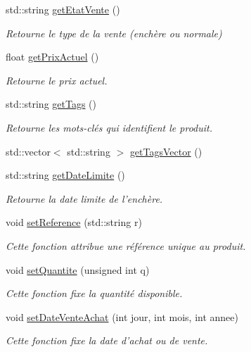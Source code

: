 \begin{DoxyCompactItemize}
std\-::string \hyperlink{class_produit_aa0421a8a8a05684059fa5c26fc6b09e5}{get\-Etat\-Vente} ()
\begin{DoxyCompactList}\small\item\em Retourne le type de la vente (enchère ou normale) \end{DoxyCompactList}\item 
float \hyperlink{class_produit_a8df31b7e2ca9fc0cf330cbed2efd22d0}{get\-Prix\-Actuel} ()
\begin{DoxyCompactList}\small\item\em Retourne le prix actuel. \end{DoxyCompactList}\item 
std\-::string \hyperlink{class_produit_a7b44df89f061edee42a971f2c172965b}{get\-Tags} ()
\begin{DoxyCompactList}\small\item\em Retourne les mots-\/clés qui identifient le produit. \end{DoxyCompactList}\item 
std\-::vector$<$ std\-::string $>$ \hyperlink{class_produit_ab8b15ff1ad286eb2e8a8f9afae3194f1}{get\-Tags\-Vector} ()
\item 
std\-::string \hyperlink{class_produit_a7bd69ad69057b77be95569b597dc058d}{get\-Date\-Limite} ()
\begin{DoxyCompactList}\small\item\em Retourne la date limite de l'enchère. \end{DoxyCompactList}\item 
void \hyperlink{class_produit_a34da537b2544450854d932c2cb695d6d}{set\-Reference} (std\-::string r)
\begin{DoxyCompactList}\small\item\em Cette fonction attribue une référence unique au produit. \end{DoxyCompactList}\item 
void \hyperlink{class_produit_aee71ce4e667afde2773fea21c663d816}{set\-Quantite} (unsigned int q)
\begin{DoxyCompactList}\small\item\em Cette fonction fixe la quantité disponible. \end{DoxyCompactList}\item 
void \hyperlink{class_produit_a609f2dfcf93cc5a41ef69f3e4ed4598f}{set\-Date\-Vente\-Achat} (int jour, int mois, int annee)
\begin{DoxyCompactList}\small\item\em Cette fonction fixe la date d'achat ou de vente. \end{DoxyCompactList}\item 

\end{DoxyCompactItemize}
